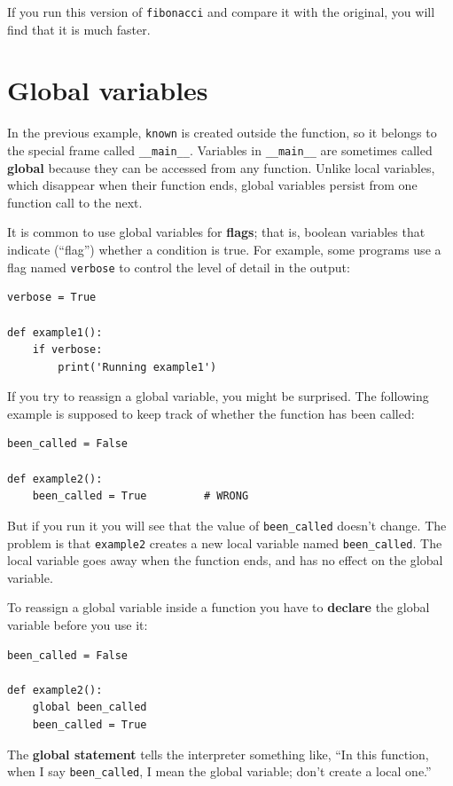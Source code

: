 \documentclass[10pt]{book}
\begin{document}
If you run this version of {\tt fibonacci} and compare it with
the original, you will find that it is much faster.



\section{Global variables}

In the previous example, {\tt known} is created outside the function,
so it belongs to the special frame called \verb"__main__".
Variables in \verb"__main__" are sometimes called {\bf global}
because they can be accessed from any function.  Unlike local
variables, which disappear when their function ends, global variables
persist from one function call to the next.

It is common to use global variables for {\bf flags}; that is,
boolean variables that indicate (``flag'') whether a condition
is true.  For example, some programs use
a flag named {\tt verbose} to control the level of detail in the
output:

\begin{verbatim}
verbose = True

def example1():
    if verbose:
        print('Running example1')
\end{verbatim}
%
If you try to reassign a global variable, you might be surprised.
The following example is supposed to keep track of whether the
function has been called:

\begin{verbatim}
been_called = False

def example2():
    been_called = True         # WRONG
\end{verbatim}
%
But if you run it you will see that the value of \verb"been_called"
doesn't change.  The problem is that {\tt example2} creates a new local
variable named \verb"been_called".  The local variable goes away when
the function ends, and has no effect on the global variable.

To reassign a global variable inside a function you have to
{\bf declare} the global variable before you use it:

\begin{verbatim}
been_called = False

def example2():
    global been_called
    been_called = True
\end{verbatim}
%
The {\bf global statement} tells the interpreter
something like, ``In this function, when I say \verb"been_called", I
mean the global variable; don't create a local one.''
\end{document}

